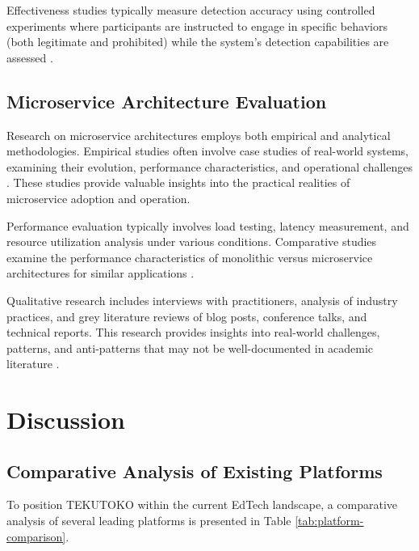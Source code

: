 Effectiveness studies typically measure detection accuracy using controlled experiments where participants are instructed to engage in specific behaviors (both legitimate and prohibited) while the system's detection capabilities are assessed \citep{balderas2021}.

\subsection{Microservice Architecture Evaluation}

Research on microservice architectures employs both empirical and analytical methodologies. Empirical studies often involve case studies of real-world systems, examining their evolution, performance characteristics, and operational challenges \citep{richards2020}. These studies provide valuable insights into the practical realities of microservice adoption and operation.

Performance evaluation typically involves load testing, latency measurement, and resource utilization analysis under various conditions. Comparative studies examine the performance characteristics of monolithic versus microservice architectures for similar applications \citep{richards2020}.

Qualitative research includes interviews with practitioners, analysis of industry practices, and grey literature reviews of blog posts, conference talks, and technical reports. This research provides insights into real-world challenges, patterns, and anti-patterns that may not be well-documented in academic literature \citep{richards2020}.

\section{Discussion}
\label{sec:lit-discussion}

\subsection{Comparative Analysis of Existing Platforms}

To position TEKUTOKO within the current EdTech landscape, a comparative analysis of several leading platforms is presented in Table \ref{tab:platform-comparison}.

